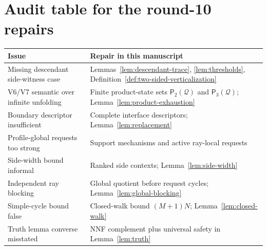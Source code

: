 \documentclass[11pt]{article}
\newcommand{\Q}{\mathcal Q}
\newcommand{\Pairs}{\mathsf{P}_2}
\newcommand{\Triples}{\mathsf{P}_3}
\begin{document}
\appendix
\section{Audit table for the round-10 repairs}

\begin{center}
\small
\begin{tabular}{p{.35\linewidth}p{.55\linewidth}}
\toprule
Issue & Repair in this manuscript\\\midrule
Missing descendant side-witness case & Lemmas~\ref{lem:descendant-trace}, \ref{lem:thresholds}, Definition~\ref{def:two-sided-verticalization}\\
V6/V7 semantic over infinite unfolding & Finite product-state sets $\Pairs(\Q)$ and $\Triples(\Q)$; Lemma~\ref{lem:product-exhaustion}\\
Boundary descriptor insufficient & Complete interface descriptors; Lemma~\ref{lem:replacement}\\
Profile-global requests too strong & Support mechanisms and active ray-local requests\\
Side-width bound informal & Ranked side contexts; Lemma~\ref{lem:side-width}\\
Independent ray blocking & Global quotient before request cycles; Lemma~\ref{lem:global-blocking}\\
Simple-cycle bound false & Closed-walk bound $(M+1)N$; Lemma~\ref{lem:closed-walk}\\
Truth lemma converse misstated & NNF complement plus universal safety in Lemma~\ref{lem:truth}\\
\bottomrule
\end{tabular}
\end{center}
\end{document}
